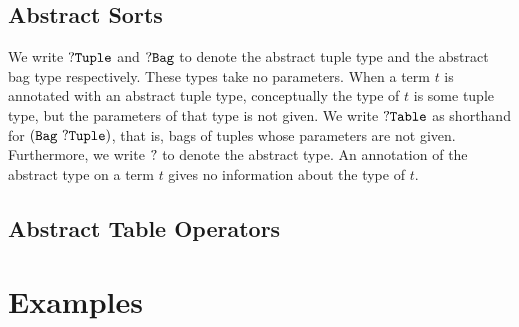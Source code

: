 \documentclass[english,a4paper,10pt]{article}
\begin{document}
\subsection{Abstract Sorts}
We write
${\tt ?Tuple}$ and ${\tt ?Bag}$
to denote the abstract tuple type and the abstract bag type respectively.
These types take no parameters.
When a term $t$ is annotated with an abstract tuple type,
conceptually the type of $t$ is some tuple type,
but the parameters of that type is not given.
We write ${\tt ?Table}$ as shorthand for $\syntax{( Bag\ \abstype{Tuple})}$,
that is, bags of tuples whose parameters are not given.
Furthermore, we write ${\tt ?}$ to denote
the abstract type.
An annotation of the abstract type on a term $t$ gives no information about the type of $t$.

\subsection{Abstract Table Operators}


\section{Examples}
\end{document}
